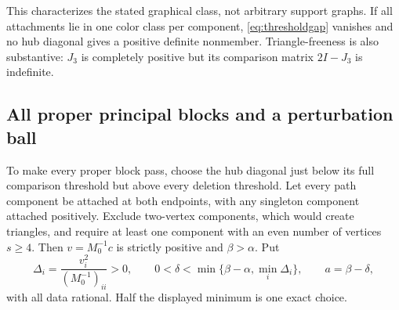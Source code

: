 This characterizes the stated graphical class, not arbitrary support graphs. If all attachments lie in one color class per component, \eqref{eq:thresholdgap} vanishes and no hub diagonal gives a positive definite nonmember. Triangle-freeness is also substantive: $J_3$ is completely positive but its comparison matrix $2I-J_3$ is indefinite.

\subsection{All proper principal blocks and a perturbation ball}
To make every proper block pass, choose the hub diagonal just below its full comparison threshold but above every deletion threshold. Let every path component be attached at both endpoints, with any singleton component attached positively. Exclude two-vertex components, which would create triangles, and require at least one component with an even number of vertices $s\ge4$. Then $v=M_0^{-1}c$ is strictly positive and $\beta>\alpha$. Put
\begin{equation}\label{eq:deletionmargins}
 \Delta_i=\frac{v_i^2}{(M_0^{-1})_{ii}}>0,\qquad
 0<\delta<\min\{\beta-\alpha,\min_i\Delta_i\},\qquad
 a=\beta-\delta,
\end{equation}
with all data rational. Half the displayed minimum is one exact choice.

